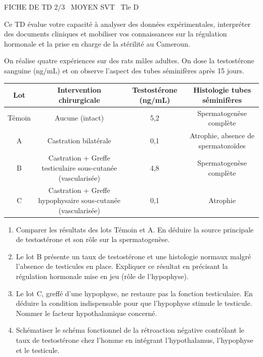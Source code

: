 \documentclass[11pt]{article}
\begin{document}
\begin{tcolorbox}[enhanced,colback=popink,colframe=popink,arc=10pt,boxrule=0pt,left=12pt,right=12pt,top=9pt,bottom=9pt]
{\color{white}\popxbold\small FICHE DE TD 2/3 \textbullet\ MOYEN \hfill SVT \textbullet\ Tle D\par}
\end{tcolorbox}
\vspace{4pt}
Ce TD évalue votre capacité à analyser des données expérimentales, interpréter des documents cliniques et mobiliser vos connaissances sur la régulation hormonale et la prise en charge de la stérilité au Cameroun.

\begin{exercice}
On réalise quatre expériences sur des rats mâles adultes. On dose la testostérone sanguine (ng/mL) et on observe l'aspect des tubes séminifères après 15 jours.
\begin{center}
\begin{tabular}{|c|c|c|c|}
\hline
\textbf{Lot} & \textbf{Intervention chirurgicale} & \textbf{Testostérone (ng/mL)} & \textbf{Histologie tubes séminifères} \\
\hline
Témoin & Aucune (intact) & 5,2 & Spermatogenèse complète \\
A & Castration bilatérale & 0,1 & Atrophie, absence de spermatozoïdes \\
B & Castration + Greffe testiculaire sous-cutanée (vascularisée) & 4,8 & Spermatogenèse complète \\
C & Castration + Greffe hypophysaire sous-cutanée (vascularisée) & 0,1 & Atrophie \\
\hline
\end{tabular}
\end{center}
\begin{enumerate}
    \item Comparer les résultats des lots Témoin et A. En déduire la source principale de testostérone et son rôle sur la spermatogenèse.
    \item Le lot B présente un taux de testostérone et une histologie normaux malgré l'absence de testicules en place. Expliquer ce résultat en précisant la régulation hormonale mise en jeu (rôle de l'hypophyse).
    \item Le lot C, greffé d'une hypophyse, ne restaure pas la fonction testiculaire. En déduire la condition indispensable pour que l'hypophyse stimule le testicule. Nommer le facteur hypothalamique concerné.
    \item Schématiser le schéma fonctionnel de la rétroaction négative contrôlant le taux de testostérone chez l'homme en intégrant l'hypothalamus, l'hypophyse et le testicule.
\end{enumerate}
\end{exercice}
\end{document}
